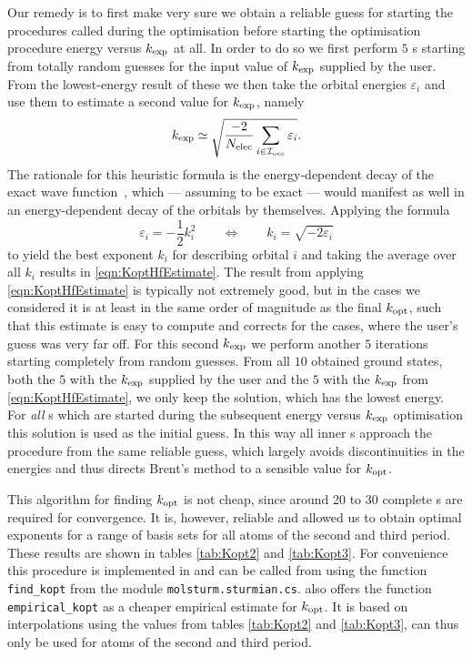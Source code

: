 Our remedy is to first make very sure we obtain a reliable
guess for starting the \SCF procedures called during the optimisation
before starting the optimisation procedure energy versus $k_\text{exp}$ at all.
In order to do so
we first perform $5$ {\SCF}s starting from totally random guesses
for the input value of $k_\text{exp}$ supplied by the user.
From the lowest-energy result of these we then
take the orbital energies $\varepsilon_i$
and use them to estimate a second value for $k_\text{exp}$, namely
\begin{equation}
	k_\text{exp} \simeq \sqrt{\frac{-2}{N_\text{elec}} \sum_{i\in\mathcal{I}_\text{occ}} \varepsilon_i}.
	\label{eqn:KoptHfEstimate}
\end{equation}
The rationale for this heuristic formula is
the energy-dependent decay of the exact wave function~\cite{Kato1951},
which --- assuming \HF to be exact --- would manifest as well in an
energy-dependent decay of the orbitals by themselves.
Applying the formula
\[ \varepsilon_i = - \frac12 k_i^2 \qquad \Leftrightarrow \qquad k_i
	= \sqrt{-2 \varepsilon_i}
\]
to yield the best exponent $k_i$ for describing orbital $i$ and taking the average
over all $k_i$ results in \eqref{eqn:KoptHfEstimate}.
The result from applying \eqref{eqn:KoptHfEstimate} is typically not extremely good,
but in the cases we considered it is at least in the same order of magnitude
as the final $k_\text{opt}$,
such that this estimate is easy to compute and corrects for the cases,
where the user's guess was very far off.
For this second $k_\text{exp}$ we perform another $5$ \SCF iterations
starting completely from random guesses.
From all $10$ obtained \SCF ground states,
both the $5$ with the $k_\text{exp}$ supplied by the user and the $5$ with the $k_\text{exp}$
from \eqref{eqn:KoptHfEstimate},
we only keep the solution, which has the lowest \HF energy.
For \emph{all} {\SCF}s which are started during the
subsequent energy versus $k_\text{exp}$ optimisation
this solution is used as the initial guess.
In this way all inner {\SCF}s approach the \SCF procedure
from the same reliable guess,
which largely avoids discontinuities in the \HF energies
and thus directs Brent's method to a sensible value for $k_\text{opt}$.

This algorithm for finding $k_\text{opt}$ is not cheap,
since around 20 to 30 complete {\SCF}s are required for convergence.
It is, however, reliable and allowed us to obtain optimal exponents
for a range of basis sets for all atoms of the second and third period.
These results are shown in tables \vref{tab:Kopt2} and \vref{tab:Kopt3}.
For convenience this procedure is implemented in \molsturm
and can be called from \python using the function
\texttt{find\_kopt} from the module \texttt{molsturm.sturmian.cs}.
\molsturm also offers the function \texttt{empirical\_kopt}
as a cheaper empirical estimate for $k_\text{opt}$.
It is based on interpolations using the values from
tables \ref{tab:Kopt2} and \ref{tab:Kopt3},
can thus only be used for atoms of the second and third period.

